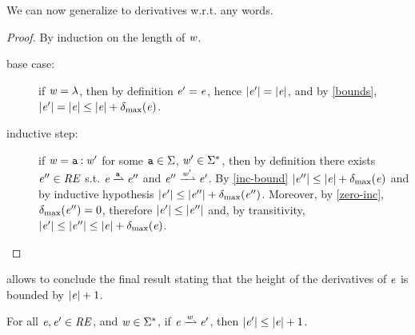 We can now generalize  to derivatives w.r.t. any words.
\begin{proof}
 By induction on the length of $\mathit {w}$.
 \begin{description}
  \item[base case:] if $\mathit {w}=\lambda$, then by definition $\mathit {e}'=\mathit {e}$, hence
   ${\mid}{\mathit {e}'}{\mid}={\mid}{\mathit {e}}{\mid}$, and by \cref{bounds}, ${\mid}{\mathit {e}'}{\mid}={\mid}{\mathit {e}}{\mid}\leq{\mid}{\ensuremath{\mathit {e}}}{\mid}+{\delta_{\max}}({\mathit {e}})$.

  \item[inductive step:]
   if $\mathit {w}=\mathtt {a}\mathbin{:}\mathit {w}'$ for some $\mathtt {a}\in\Sigma$, $\mathit {w}'\in\Sigma^*$, then by definition there exists $\mathit {e}''\in\mathit {RE}$ s.t. $\re\parDer{\sym}\re''$ and $\re''\parDer{\word'}\re'$. By \cref{inc-bound} ${\mid}{\mathit {e}''}{\mid}\leq{\mid}{\ensuremath{\mathit {e}}}{\mid}+{\delta_{\max}}({\mathit {e}})$ and by inductive hypothesis ${\mid}{\mathit {e}'}{\mid}\leq{\mid}{\ensuremath{\mathit {e}}''}{\mid}+{\delta_{\max}}({\mathit {e}''})$. Moreover, by \cref{zero-inc},
   ${\delta_{\max}}({\mathit {e}''})=0$, therefore ${\mid}{\mathit {e}'}{\mid}\leq{\mid}{\ensuremath{\mathit {e}}''}{\mid}$ and, by transitivity,
   ${\mid}{\mathit {e}'}{\mid}\leq{\mid}{\ensuremath{\mathit {e}}''}{\mid}\leq{\mid}{\ensuremath{\mathit {e}}}{\mid}+{\delta_{\max}}({\mathit {e}})$.
 \end{description}
\end{proof}

 allows to conclude the final result stating that the height of the derivatives of $\mathit {e}$ is bounded by ${\mid}{\mathit {e}}{\mid}+1$.
\begin{corollary}
 For all $\mathit {e},\mathit {e}'\in\mathit {RE}$, and $\mathit {w}\in\Sigma^*$, if $\re\parDer{\word}\re'$, then ${\mid}{\mathit {e}'}{\mid}\leq{\mid}{\ensuremath{\mathit {e}}}{\mid}+1$.
\end{corollary}